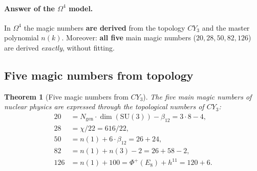 \documentclass[11pt,a4paper]{article}
\newcommand{\SU}{\mathrm{SU}}
\newcommand{\CY}{CY_3}
\newcommand{\Om}{\Omega^4}
\newcommand{\Ngen}{N_{\text{gen}}}
\newtheorem{theorem}{Theorem}[section]
\theoremstyle{definition}
\begin{document}
\paragraph{Answer of the $\Om$ model.}
In $\Om$ the magic numbers \textbf{are derived} from the topology $\CY$ 
and the master polynomial $n(k)$. Moreover: \textbf{all five} main 
magic numbers ($20, 28, 50, 82, 126$) are derived \emph{exactly}, 
without fitting.

\subsection{Five magic numbers from topology}
\label{subsec:magic-five}

\begin{theorem}[Five magic numbers from $\CY$]
\label{thm:magic-five}
The five main magic numbers of nuclear physics are expressed 
through the topological numbers of $\CY$:
\begin{align}
    20 &= \Ngen \cdot \dim(\SU(3)) - \beta_{12}
        = 3 \cdot 8 - 4,
    \label{eq:magic-20} \\[0.3em]
    28 &= \chi / 22 = 616 / 22,
    \label{eq:magic-28} \\[0.3em]
    50 &= n(1) + 6 \cdot \beta_{12} = 26 + 24,
    \label{eq:magic-50} \\[0.3em]
    82 &= n(1) + n(3) - 2 = 26 + 58 - 2,
    \label{eq:magic-82} \\[0.3em]
    126 &= n(1) + 100 = \Phi^+(E_8) + h^{11} = 120 + 6.
    \label{eq:magic-126}
\end{align}
\end{theorem}
\end{document}
